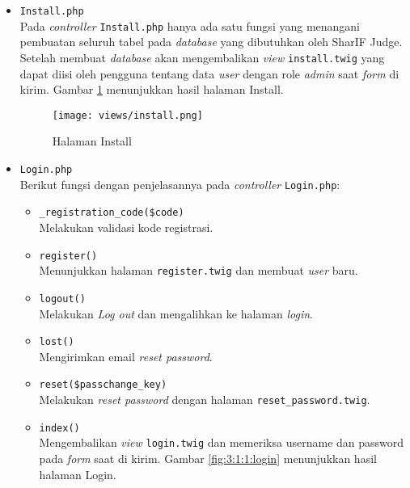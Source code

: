 \begin{itemize}
\begin{itemize}
	      \end{itemize}

	\item \verb|Install.php| \\
	      Pada \textit{controller} \verb|Install.php| hanya ada satu fungsi yang menangani pembuatan seluruh tabel pada \textit{database} yang dibutuhkan oleh SharIF Judge. Setelah membuat \textit{database} akan mengembalikan \textit{view} \verb|install.twig| yang dapat diisi oleh pengguna tentang data \textit{user} dengan role \textit{admin} saat \textit{form} di kirim. Gambar \ref{fig:3:1:1:install} menunjukkan hasil halaman Install.

	      \begin{figure}[H]
		      \centering
		      \texttt{[image: views/install.png]}
		      \caption{Halaman Install}
		      \label{fig:3:1:1:install}
	      \end{figure}


	\item \verb|Login.php| \\
	      Berikut fungsi dengan penjelasannya pada \textit{controller} \verb|Login.php|:

	      \begin{itemize}
		      \item \verb|_registration_code($code)| \\
		            Melakukan validasi kode registrasi.
		      \item \verb|register()| \\
		            Menunjukkan halaman \verb|register.twig| dan membuat \textit{user} baru.
		      \item \verb|logout()| \\
		            Melakukan \textit{Log out} dan mengalihkan ke halaman \textit{login}.
		      \item \verb|lost()| \\
		            Mengirimkan email \textit{reset password}.
		      \item \verb|reset($passchange_key)| \\
		            Melakukan \textit{reset password} dengan halaman \verb|reset_password.twig|.
		      \item \verb|index()| \\
		            Mengembalikan \textit{view} \verb|login.twig| dan memeriksa username dan password pada \textit{form} saat di kirim. Gambar \ref{fig:3:1:1:login} menunjukkan hasil halaman Login.


\end{itemize}
\end{itemize}
